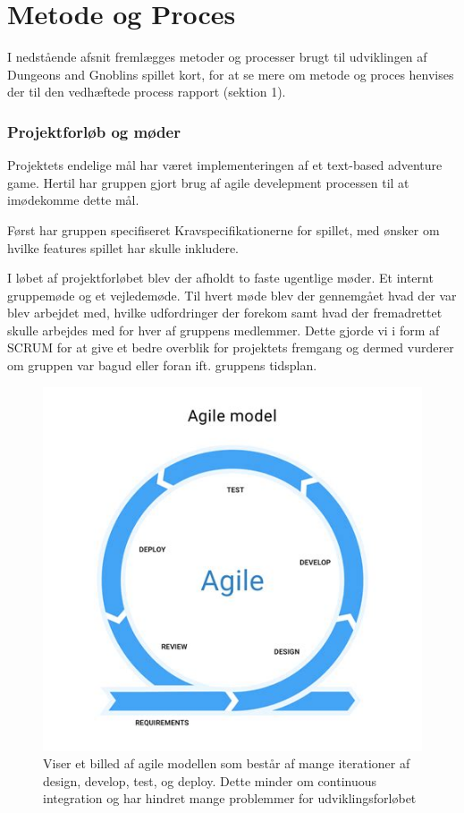 \section{Metode og Proces}
I nedstående afsnit fremlægges metoder og processer brugt til udviklingen af
Dungeons and Gnoblins spillet kort, for at se mere om metode og proces henvises der til den vedhæftede process rapport (sektion 1).

\subsubsection{Projektforløb og møder}
Projektets endelige mål har været implementeringen af et text-based adventure game.
Hertil har gruppen gjort brug af agile develepment processen til at imødekomme dette mål.

Først har gruppen specifiseret Kravspecifikationerne for spillet, med ønsker om
hvilke features spillet har skulle inkludere.

I løbet af projektforløbet blev der afholdt to faste ugentlige møder. Et internt gruppemøde og et vejledemøde. Til hvert møde blev der gennemgået hvad der var blev arbejdet med, hvilke udfordringer der forekom samt hvad der fremadrettet skulle arbejdes med for hver af gruppens medlemmer. Dette gjorde vi i form af SCRUM for at give et bedre overblik for projektets fremgang og dermed vurderer om gruppen var bagud eller foran ift. gruppens tidsplan.

\begin{figure}[H]
  \centering
  \includegraphics[scale=.5]{02-Body/Images/Agile.png}
  \caption{Viser et billed af agile modellen som består af mange iterationer
           af design, develop, test, og deploy. Dette minder om continuous integration
           og har hindret mange problemmer for udviklingsforløbet}
  \label{fig:Agile}
\end{figure}

